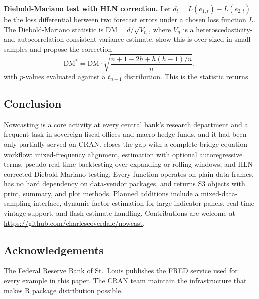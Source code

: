 \textbf{Diebold-Mariano test with HLN correction.} Let
\(d_t = L(e_{1,t}) - L(e_{2,t})\) be the loss differential between two
forecast errors under a chosen loss function \(L\). The Diebold-Mariano
statistic is \(\mathrm{DM} = \bar{d} / \sqrt{V_n}\), where \(V_n\) is a
heteroscedasticity-and-autocorrelation-consistent variance estimate.
\citet{harvey1997testing} show this is over-sized in small samples and
propose the correction \[\mathrm{DM}^* = \mathrm{DM} \cdot
  \sqrt{\frac{n + 1 - 2h + h(h-1)/n}{n}},\] with \(p\)-values evaluated
against a \(t_{n-1}\) distribution. This is the statistic
 returns.

\subsection{Conclusion}\label{conclusion}

Nowcasting is a core activity at every central bank's research
department and a frequent task in sovereign fiscal offices and
macro-hedge funds, and it had been only partially served on CRAN.
 closes the gap with a complete bridge-equation
workflow: mixed-frequency alignment, estimation with optional
autoregressive terms, pseudo-real-time backtesting over expanding or
rolling windows, and HLN-corrected Diebold-Mariano testing. Every
function operates on plain data frames, has no hard dependency on
data-vendor packages, and returns S3 objects with print, summary, and
plot methods. Planned additions include a mixed-data-sampling interface,
dynamic-factor estimation for large indicator panels, real-time vintage
support, and flash-estimate handling. Contributions are welcome at
\url{https://github.com/charlescoverdale/nowcast}.

\subsection*{Acknowledgements}\label{acknowledgements}

The Federal Reserve Bank of St.~Louis publishes the FRED service used
for every example in this paper. The CRAN team maintain the
infrastructure that makes R package distribution possible.



\address{%
Charles Coverdale\\
London, United Kingdom\\%
United Kingdom\\
%
\url{https://github.com/charlescoverdale/nowcast}\\%
%
\href{mailto:charles.f.coverdale@gmail.com}{\nolinkurl{charles.f.coverdale@gmail.com}}%
}
